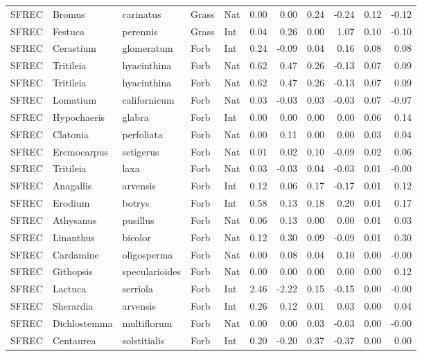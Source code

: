 \documentclass[twoside,12pt,final]{ucthesis-CA2012}
\begin{document}
\begin{ucmainmatter}
\begin{table}[ht]
{\begin{tabular}{lllllrrrrrr}
  SFREC & Bromus & carinatus & Grass & Nat & 0.00 & 0.00 & 0.24 & -0.24 & 0.12 & -0.12 \\ 
  SFREC & Festuca & perennis & Grass & Int & 0.04 & 0.26 & 0.00 & 1.07 & 0.10 & -0.10 \\ 
  SFREC & Cerastium & glomeratum & Forb & Int & 0.24 & -0.09 & 0.04 & 0.16 & 0.08 & 0.08 \\ 
  SFREC & Tritileia & hyacinthina & Forb & Nat & 0.62 & 0.47 & 0.26 & -0.13 & 0.07 & 0.09 \\ 
  SFREC & Tritileia & hyacinthina & Forb & Nat & 0.62 & 0.47 & 0.26 & -0.13 & 0.07 & 0.09 \\ 
  SFREC & Lomatium & californicum & Forb & Nat & 0.03 & -0.03 & 0.03 & -0.03 & 0.07 & -0.07 \\ 
  SFREC & Hypochaeris & glabra & Forb & Int & 0.00 & 0.00 & 0.00 & 0.00 & 0.06 & 0.14 \\ 
  SFREC & Clatonia & perfoliata & Forb & Nat & 0.00 & 0.11 & 0.00 & 0.00 & 0.03 & 0.04 \\ 
  SFREC & Eremocarpus & setigerus & Forb & Nat & 0.01 & 0.02 & 0.10 & -0.09 & 0.02 & 0.06 \\ 
  SFREC & Tritileia & laxa & Forb & Nat & 0.03 & -0.03 & 0.04 & -0.03 & 0.01 & -0.00 \\ 
  SFREC & Anagallis & arvensis & Forb & Int & 0.12 & 0.06 & 0.17 & -0.17 & 0.01 & 0.12 \\ 
  SFREC & Erodium & botrys & Forb & Int & 0.58 & 0.13 & 0.18 & 0.20 & 0.01 & 0.17 \\ 
  SFREC & Athysanus & pusillus & Forb & Nat & 0.06 & 0.13 & 0.00 & 0.00 & 0.01 & 0.03 \\ 
  SFREC & Linanthus & bicolor & Forb & Nat & 0.12 & 0.30 & 0.09 & -0.09 & 0.01 & 0.30 \\ 
  SFREC & Cardamine & oligosperma & Forb & Nat & 0.00 & 0.08 & 0.04 & 0.10 & 0.00 & -0.00 \\ 
  SFREC & Githopsis & specularioides & Forb & Nat & 0.00 & 0.00 & 0.00 & 0.00 & 0.00 & 0.12 \\ 
  SFREC & Lactuca & serriola & Forb & Int & 2.46 & -2.22 & 0.15 & -0.15 & 0.00 & -0.00 \\ 
  SFREC & Sherardia & arvensis & Forb & Int & 0.26 & 0.12 & 0.01 & 0.03 & 0.00 & 0.04 \\ 
  SFREC & Dichlostemma & multiflorum & Forb & Nat & 0.00 & 0.00 & 0.03 & -0.03 & 0.00 & -0.00 \\ 
  SFREC & Centaurea & solstitialis & Forb & Int & 0.20 & -0.20 & 0.37 & -0.37 & 0.00 & 0.00 \\ 

\end{tabular}}
\end{table}
\end{ucmainmatter}
\end{document}
